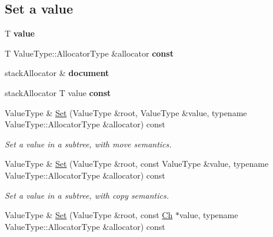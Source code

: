 \subsection*{Set a value}
\begin{DoxyCompactItemize}
\item 
T {\bfseries value}\hypertarget{classGenericPointer_a08ef35da0ea9a51d8265a360f0c34540}{}\label{classGenericPointer_a08ef35da0ea9a51d8265a360f0c34540}

\item 
T Value\+Type\+::\+Allocator\+Type \&allocator {\bfseries const}
\item 
stack\+Allocator \& {\bfseries document}\hypertarget{classGenericPointer_afd073c4e3be53fd7ec08aec9f75fbaa9}{}\label{classGenericPointer_afd073c4e3be53fd7ec08aec9f75fbaa9}

\item 
stack\+Allocator T value {\bfseries const}
\item 
Value\+Type \& \hyperlink{classGenericPointer_adf0aa776e072b41d301e2a834ac2c2b5}{Set} (Value\+Type \&root, Value\+Type \&value, typename Value\+Type\+::\+Allocator\+Type \&allocator) const 
\begin{DoxyCompactList}\small\item\em Set a value in a subtree, with move semantics. \end{DoxyCompactList}\item 
Value\+Type \& \hyperlink{classGenericPointer_a80ceefa779d8d8e4699c433eb40ef1fa}{Set} (Value\+Type \&root, const Value\+Type \&value, typename Value\+Type\+::\+Allocator\+Type \&allocator) const \hypertarget{classGenericPointer_a80ceefa779d8d8e4699c433eb40ef1fa}{}\label{classGenericPointer_a80ceefa779d8d8e4699c433eb40ef1fa}

\begin{DoxyCompactList}\small\item\em Set a value in a subtree, with copy semantics. \end{DoxyCompactList}\item 
Value\+Type \& \hyperlink{classGenericPointer_ae62ceea598633d21ad648b431b23c26a}{Set} (Value\+Type \&root, const \hyperlink{classGenericPointer_ab292356c11b4015c98d21b966b11f285}{Ch} $\ast$value, typename Value\+Type\+::\+Allocator\+Type \&allocator) const \hypertarget{classGenericPointer_ae62ceea598633d21ad648b431b23c26a}{}\label{classGenericPointer_ae62ceea598633d21ad648b431b23c26a}


\end{DoxyCompactItemize}
